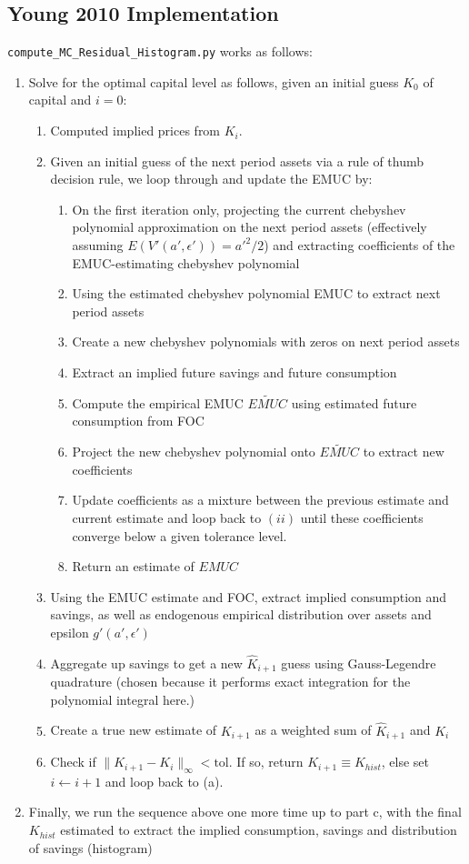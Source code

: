 \documentclass[11pt]{article}
\newcommand{\code}[1]{\texttt{#1}}
\begin{document}
\subsection{Young 2010 Implementation}
\code{compute\_MC\_Residual\_Histogram.py} works as follows:
\begin{enumerate}
	\item Solve for the optimal capital level as follows, given an initial guess $K_0$ of capital and $i=0$:
	\begin{enumerate}
	\item Computed implied prices from $K_i$.
	\item Given an initial guess of the next period assets via a rule of thumb decision rule, we loop through and update the EMUC by:
	\begin{enumerate}
	\item On the first iteration only, projecting the current chebyshev polynomial approximation on the next period assets (effectively assuming $E(V'(a',\epsilon'))={a'}^2/2$) and extracting coefficients of  the EMUC-estimating chebyshev polynomial
	\item Using the estimated chebyshev polynomial EMUC to extract next period assets
	\item   Create a new  chebyshev polynomials with zeros on next period assets
	\item Extract an implied future savings and future consumption
	\item  Compute the empirical EMUC $\widetilde{EMUC}$ using estimated future consumption from FOC
	\item  Project the new chebyshev polynomial onto $\widetilde{EMUC}$ to extract new coefficients
	\item  Update coefficients as a mixture between the previous estimate and current estimate and loop back to $(ii)$ until these coefficients converge below a given tolerance level.	
	\item Return an estimate of $EMUC$
	\end{enumerate}
	\item Using the EMUC estimate and FOC, extract implied consumption and savings, as well as endogenous empirical distribution over assets and epsilon $g'(a',\epsilon')$
	\item Aggregate up savings to get a new $\hat{K}_{i+1}$ guess using Gauss-Legendre quadrature (chosen because it performs exact integration for the polynomial integral here.)
	\item Create a true new estimate of $K_{i+1}$ as a weighted sum of $\hat{K}_{i+1}$ and $K_{i}$ 
	\item Check  if $\lVert{K_{i+1} - K_{i}}\rVert_{\infty}<\text{tol} $. If so, return $K_{i+1}\equiv K_{hist}$, else set $i \leftarrow i+1$ and loop back to (a).
	\end{enumerate}
	\item Finally, we run the sequence above one more time up to part c, with the final $K_{hist}$ estimated to extract the implied consumption, savings and distribution of savings (histogram)
\end{enumerate}
\end{document}
